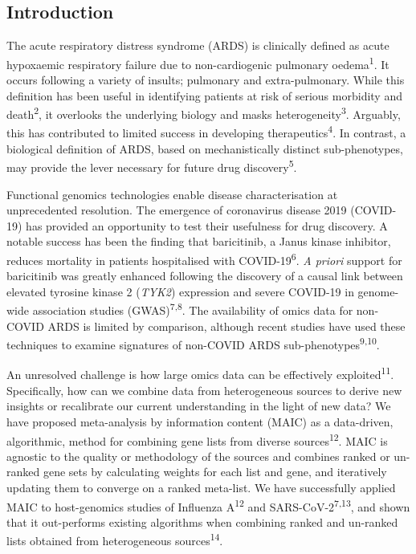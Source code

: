 \documentclass[
  11,
  a4paper,
]{article}
\begin{document}
\newpage

\hypertarget{introduction}{%
\subsection{Introduction}\label{introduction}}

The acute respiratory distress syndrome (ARDS) is clinically defined as
acute hypoxaemic respiratory failure due to non-cardiogenic pulmonary
oedema\textsuperscript{1}. It occurs following a variety of insults;
pulmonary and extra-pulmonary. While this definition has been useful in
identifying patients at risk of serious morbidity and
death\textsuperscript{2}, it overlooks the underlying biology and masks
heterogeneity\textsuperscript{3}. Arguably, this has contributed to
limited success in developing therapeutics\textsuperscript{4}. In
contrast, a biological definition of ARDS, based on mechanistically
distinct sub-phenotypes, may provide the lever necessary for future drug
discovery\textsuperscript{5}.

Functional genomics technologies enable disease characterisation at
unprecedented resolution. The emergence of coronavirus disease 2019
(COVID-19) has provided an opportunity to test their usefulness for drug
discovery. A notable success has been the finding that baricitinib, a
Janus kinase inhibitor, reduces mortality in patients hospitalised with
COVID-19\textsuperscript{6}. \emph{A priori} support for baricitinib was
greatly enhanced following the discovery of a causal link between
elevated tyrosine kinase 2 (\emph{TYK2}) expression and severe COVID-19
in genome-wide association studies (GWAS)\textsuperscript{7,8}. The
availability of omics data for non-COVID ARDS is limited by comparison,
although recent studies have used these techniques to examine signatures
of non-COVID ARDS sub-phenotypes\textsuperscript{9,10}.

An unresolved challenge is how large omics data can be effectively
exploited\textsuperscript{11}. Specifically, how can we combine data
from heterogeneous sources to derive new insights or recalibrate our
current understanding in the light of new data? We have proposed
meta-analysis by information content (MAIC) as a data-driven,
algorithmic, method for combining gene lists from diverse
sources\textsuperscript{12}. MAIC is agnostic to the quality or
methodology of the sources and combines ranked or un-ranked gene sets by
calculating weights for each list and gene, and iteratively updating
them to converge on a ranked meta-list. We have successfully applied
MAIC to host-genomics studies of Influenza A\textsuperscript{12} and
SARS-CoV-2\textsuperscript{7,13}, and shown that it out-performs
existing algorithms when combining ranked and un-ranked lists obtained
from heterogeneous sources\textsuperscript{14}.
\end{document}
